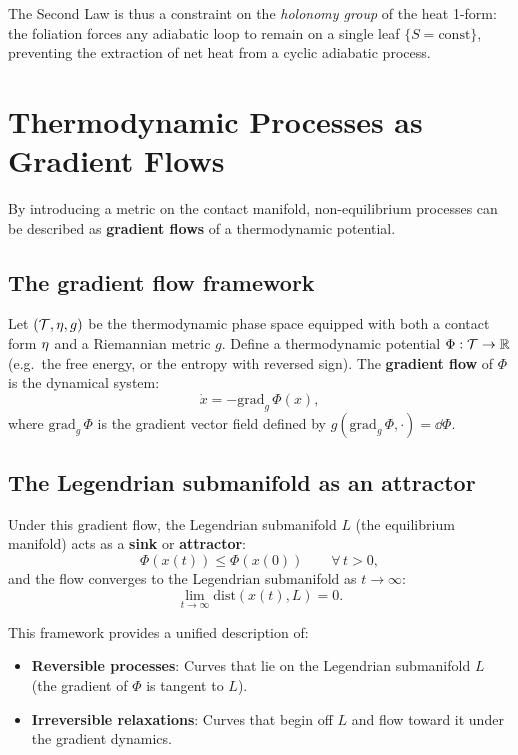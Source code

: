 The Second Law is thus a constraint on the \emph{holonomy group} of the heat 1-form: the foliation forces any adiabatic loop to remain on a single leaf $\{S = \text{const}\}$, preventing the extraction of net heat from a cyclic adiabatic process.

\section{Thermodynamic Processes as Gradient Flows}

By introducing a metric on the contact manifold, non-equilibrium processes can be described as \textbf{gradient flows} of a thermodynamic potential.

\subsection{The gradient flow framework}

Let $(\mathcal{T}, \eta, g)$ be the thermodynamic phase space equipped with both a contact form $\eta$ and a Riemannian metric $g$. Define a thermodynamic potential $\Phi: \mathcal{T} \to \mathbb{R}$ (e.g.\ the free energy, or the entropy with reversed sign). The \textbf{gradient flow} of $\Phi$ is the dynamical system:
\begin{equation}
\dot{x} = -\text{grad}_g\,\Phi(x),
\end{equation}
where $\text{grad}_g\,\Phi$ is the gradient vector field defined by $g(\text{grad}_g\,\Phi, \cdot) = \dd\Phi$.

\subsection{The Legendrian submanifold as an attractor}

Under this gradient flow, the Legendrian submanifold $L$ (the equilibrium manifold) acts as a \textbf{sink} or \textbf{attractor}:
\begin{equation}
\Phi(x(t)) \leq \Phi(x(0)) \qquad \forall\, t > 0,
\end{equation}
and the flow converges to the Legendrian submanifold as $t \to \infty$:
\begin{equation}
\lim_{t \to \infty} \text{dist}(x(t), L) = 0.
\end{equation}

This framework provides a unified description of:
\begin{itemize}
\item \textbf{Reversible processes}: Curves that lie on the Legendrian submanifold $L$ (the gradient of $\Phi$ is tangent to $L$).
\item \textbf{Irreversible relaxations}: Curves that begin off $L$ and flow toward it under the gradient dynamics.
\end{itemize}

